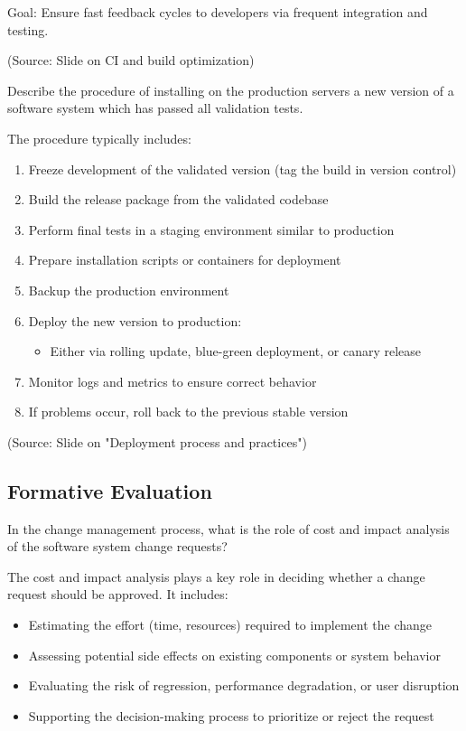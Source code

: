 \documentclass[12pt]{article}
\begin{document}
Goal: Ensure fast feedback cycles to developers via frequent integration and testing.

(Source: Slide on CI and build optimization)

\begin{questionbox}
Describe the procedure of installing on the production servers a new version of a software system which has passed all validation tests.
\end{questionbox}

The procedure typically includes:
\begin{enumerate}
    \item Freeze development of the validated version (tag the build in version control)
    \item Build the release package from the validated codebase
    \item Perform final tests in a staging environment similar to production
    \item Prepare installation scripts or containers for deployment
    \item Backup the production environment
    \item Deploy the new version to production:
    \begin{itemize}
        \item Either via rolling update, blue-green deployment, or canary release
    \end{itemize}
    \item Monitor logs and metrics to ensure correct behavior
    \item If problems occur, roll back to the previous stable version
\end{enumerate}

(Source: Slide on "Deployment process and practices")

\subsection{Formative Evaluation}

\begin{questionbox}
In the change management process, what is the role of cost and impact analysis of the software system change requests?
\end{questionbox}

The cost and impact analysis plays a key role in deciding whether a change request should be approved. It includes:
\begin{itemize}
    \item Estimating the effort (time, resources) required to implement the change
    \item Assessing potential side effects on existing components or system behavior
    \item Evaluating the risk of regression, performance degradation, or user disruption
    \item Supporting the decision-making process to prioritize or reject the request
\end{itemize}
\end{document}

